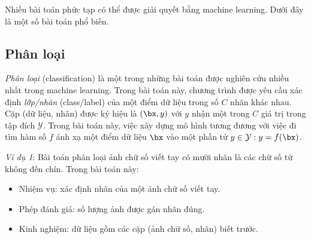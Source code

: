 
Nhiều bài toán phức tạp có thể được giải quyết bằng machine learning. Dưới đây là một số bài toán phổ biến.

\subsection{Phân loại}
\textit{Phân loại} (classification) là một
trong những bài toán được nghiên cứu nhiều nhất trong machine learning. Trong
bài toán này, chương trình được yêu cầu xác định \textit{lớp/nhãn} (class/label) của một điểm dữ liệu trong số $C$ nhãn khác nhau. Cặp (dữ liệu, nhãn) được ký hiệu là $(\bx, y)$ với $y$ nhận một trong $C$ giá trị trong tập đích $\mathcal{Y}$.
Trong bài toán này, việc xây dựng mô hình tương đương với việc đi tìm hàm số $f$ ánh xạ một điểm dữ liệu $\bx$ vào một phần tử $y \in \mathcal{Y}: y = f(\bx)$.

\textit{Ví dụ 1}: Bài toán phân loại ảnh chữ số viết tay có mười nhãn là các chữ số từ không đến chín. Trong bài toán này:
\begin{itemize}
    \item Nhiệm vụ: xác định nhãn của một ảnh chữ số viết tay.
    \item Phép đánh giá: số lượng ảnh được gán nhãn đúng.
    \item Kinh nghiệm: dữ liệu gồm các cặp (ảnh chữ số, nhãn) biết trước.
\end{itemize}

